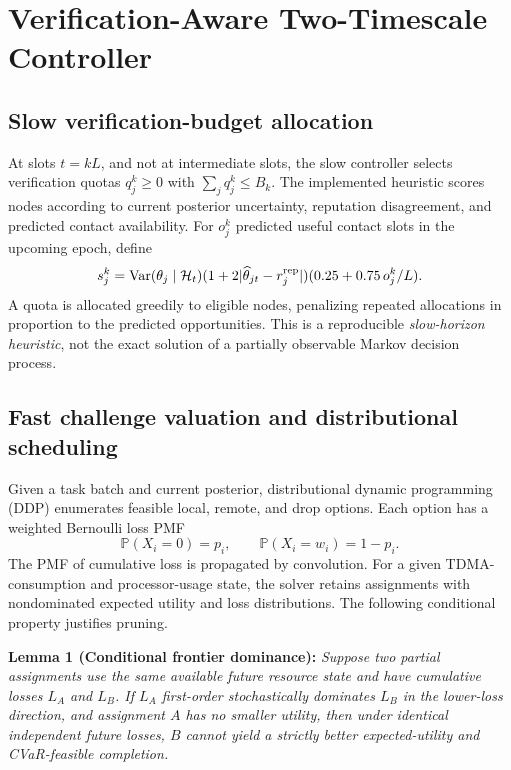 \documentclass[journal]{IEEEtran}
\newcommand{\Prob}{\mathbb P}
\newcommand{\HH}{\mathcal H}
\begin{document}
\section{Verification-Aware Two-Timescale Controller}
\subsection{Slow verification-budget allocation}
At slots $t=kL$, and not at intermediate slots, the slow controller selects verification quotas $q_j^k\ge0$ with $\sum_jq_j^k\le B_k$. The implemented heuristic scores nodes according to current posterior uncertainty, reputation disagreement, and predicted contact availability. For $o_j^k$ predicted useful contact slots in the upcoming epoch, define
\begin{equation}\label{eq:score}
 s_j^k=\operatorname{Var}(\theta_j\mid\HH_t)
 (1+2|\widehat\theta_{jt}-r_j^{\rm rep}|)
 (0.25+0.75\,o_j^k/L).
\end{equation}
A quota is allocated greedily to eligible nodes, penalizing repeated allocations in proportion to the predicted opportunities. This is a reproducible \emph{slow-horizon heuristic}, not the exact solution of a partially observable Markov decision process.

\subsection{Fast challenge valuation and distributional scheduling}
Given a task batch and current posterior, distributional dynamic programming (DDP) enumerates feasible local, remote, and drop options. Each option has a weighted Bernoulli loss PMF
\begin{equation}\label{eq:pmf}
 \Prob(X_i=0)=p_i,\qquad \Prob(X_i=w_i)=1-p_i.
\end{equation}
The PMF of cumulative loss is propagated by convolution. For a given TDMA-consumption and processor-usage state, the solver retains assignments with nondominated expected utility and loss distributions. The following conditional property justifies pruning.

\textbf{Lemma 1 (Conditional frontier dominance):} \emph{Suppose two partial assignments use the same available future resource state and have cumulative losses $L_A$ and $L_B$. If $L_A$ first-order stochastically dominates $L_B$ in the lower-loss direction, and assignment $A$ has no smaller utility, then under identical independent future losses, $B$ cannot yield a strictly better expected-utility and CVaR-feasible completion.}
\end{document}

